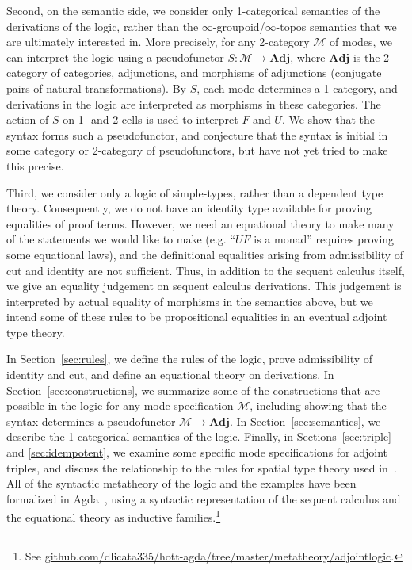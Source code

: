 \documentclass{drl-common/llncs}
\newcommand{\M}{\ensuremath{\mathcal{M}}}
\newcommand{\Adj}{\textbf{Adj}}
\begin{document}
Second, on the semantic side, we consider only 1-categorical semantics
of the derivations of the logic, rather than the $\infty$-groupoid/$\infty$-topos
semantics that we are ultimately interested in.  More precisely, for any
2-category \M\/ of modes, we can interpret the logic using a
pseudofunctor $S : \M \to \Adj$, where $\Adj$ is the 2-category of
categories, adjunctions, and morphisms of adjunctions (conjugate pairs
of natural transformations).  By $S$, each mode determines a 1-category,
and derivations in the logic are interpreted as morphisms in these
categories.  The action of $S$ on 1- and 2-cells is used to interpret
$F$ and $U$.  We show that the syntax forms such a pseudofunctor, and
conjecture that the syntax is initial in some category or 2-category of
pseudofunctors, but have not yet tried to make this precise.

Third, we consider only a logic of simple-types, rather than a dependent
type theory.  Consequently, we do not have an identity type available
for proving equalities of proof terms.  However, we need an equational
theory to make many of the statements we would like to make (e.g. ``$UF$ is a monad''
requires proving some equational laws), and the definitional equalities
arising from admissibility of cut and identity are not sufficient.
Thus, in addition to the sequent calculus itself, we give an equality
judgement on sequent calculus derivations.  This judgement is
interpreted by actual equality of morphisms in the semantics above, but
we intend some of these rules to be propositional equalities in an eventual
adjoint type theory.

In Section~\ref{sec:rules}, we define the rules of the logic, prove
admissibility of identity and cut, and define an equational theory on
derivations.  In Section~\ref{sec:constructions}, we summarize some of
the constructions that are possible in the logic for any mode
specification \M, including showing that the syntax determines a
pseudofunctor $\M \to \Adj$.  In Section~\ref{sec:semantics}, we
describe the 1-categorical semantics of the logic.  Finally, in
Sections~\ref{sec:triple} and \ref{sec:idempotent}, we examine some
specific mode specifications for adjoint triples, and discuss the
relationship to the rules for spatial type theory used
in~\citep{shulman15realcohesion}.  All of the syntactic metatheory of
the logic and the examples have been formalized in
Agda~\citep{norell07thesis}, using a syntactic representation of the
sequent calculus and the equational theory as inductive
families.\footnote{See
  \url{github.com/dlicata335/hott-agda/tree/master/metatheory/adjointlogic}.}
\end{document}
